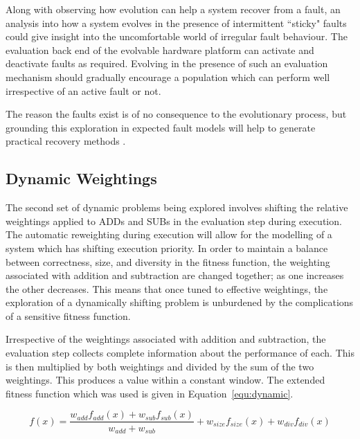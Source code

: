 Along with observing how evolution can help a system recover from a fault, an
analysis into how a system evolves in the presence of intermittent ``sticky"
faults could give insight into the uncomfortable world of irregular fault behaviour.
The evaluation back end of the evolvable hardware platform can activate and
deactivate faults as required. Evolving in the presence of such an evaluation
mechanism should gradually encourage a population which can perform well
irrespective of an active fault or not.

The reason the faults exist is of no consequence to the evolutionary process,
but grounding this exploration in expected fault models will help to generate
practical recovery methods \cite{10.1007/3-540-36553-2_5}.

\subsection{Dynamic Weightings}
The second set of dynamic problems being explored involves shifting the relative
weightings applied to ADDs and SUBs in the evaluation step during execution. The
automatic reweighting during execution will allow for the modelling of a system
which has shifting execution priority. In order to maintain a balance between
correctness, size, and diversity in the fitness function, the weighting associated
with addition and subtraction are changed together; as one increases the other
decreases. This means that once tuned to effective weightings, the exploration of
a dynamically shifting problem is unburdened by the complications of a sensitive
fitness function.

Irrespective of the weightings associated with addition and subtraction, the
evaluation step collects complete information about the performance of each.
This is then multiplied by both weightings and divided by the sum of the two
weightings. This produces a value within a constant window. The extended fitness
function which was used is given in Equation~\ref{equ:dynamic}.

\begin{equation}
	\label{equ:dynamic}
	f(x) = \frac{w_{add} f_{add}(x) + w_{sub} f_{sub}(x)}{w_{add} + w_{sub}} + w_{size} f_{size}(x) +
	w_{div} f_{div}(x)
\end{equation}
